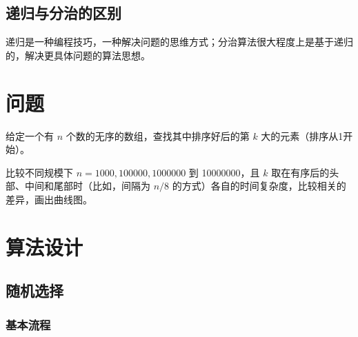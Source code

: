 \subsection{递归与分治的区别}

递归是一种编程技巧，一种解决问题的思维方式；分治算法很大程度上是基于递归的，解决更具体问题的算法思想。

\section{问题}

给定一个有 $n$ 个数的无序的数组，查找其中排序好后的第 $k$ 大的元素（排序从1开始）。

比较不同规模下 $n=1000,100000,1000000$ 到 10000000，且 $k$ 取在有序后的头部、中间和尾部时（比如，间隔为 $n/8$ 的方式）各自的时间复杂度，比较相关的差异，画出曲线图。

\section{算法设计}

\subsection{随机选择}

\subsubsection{基本流程}

